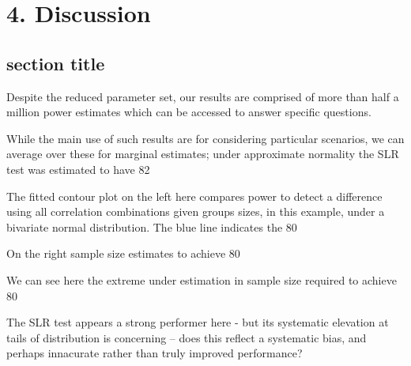\chapter*{4. Discussion}
\setcounter{chapter}{4}
\setcounter{section}{0}


\section{section title}
Despite the reduced parameter set, our results are comprised of more than half a million power estimates which can be accessed to answer specific questions.

While the main use of such results are for considering particular scenarios, we can average over these for marginal estimates; under approximate normality the SLR test was estimated to have 82%

The fitted contour plot on the left here compares power to detect a difference using all correlation combinations given groups sizes, in this example, under a bivariate normal distribution.  The blue line indicates the 80%

On the right sample size estimates to achieve 80%

We can see here the extreme under estimation in sample size required to achieve 80%

The SLR test appears a strong performer here - but its systematic elevation at tails of distribution is concerning -- does this reflect a systematic bias, and perhaps innacurate rather than truly improved performance?  

